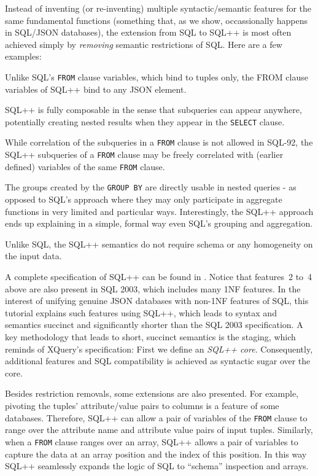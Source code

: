   Instead of inventing (or re-inventing) multiple syntactic/semantic features for the same fundamental functions (something that, as we show, occassionally happens in SQL/JSON databases), the extension from SQL to SQL++ is most often achieved simply by {\em removing} semantic restrictions of SQL. Here are a few examples:
\begin{compact_enum}
\item Unlike SQL's \texttt{FROM} clause variables, which bind to tuples only, the FROM clause variables of SQL++ bind to any JSON element.
\item SQL++ is fully composable in the sense that subqueries can appear anywhere, potentially creating nested results when they appear in the \texttt{SELECT} clause.
\item While correlation of the subqueries in a \texttt{FROM} clause is not allowed in SQL-92, the SQL++ subqueries of a \texttt{FROM} clause may be freely correlated with (earlier defined) variables of the same \texttt{FROM} clause.
\item The groups created by the \texttt{GROUP BY} are directly usable in nested queries - as opposed to SQL's approach where they may only participate in aggregate functions in very limited and particular ways. Interestingly, the SQL++ approach ends up explaining in a simple, formal way even SQL's grouping and aggregation.
\item Unlike SQL, the SQL++ semantics do not require schema or any homogeneity on the input data. 
\end{compact_enum}

A complete specification of SQL++ can be found in \cite{sqlpp-survey-2015}.
Notice that features~2 to~4 above are also present in SQL 2003, which includes many 1NF features. In the interest of unifying genuine JSON databases with non-1NF features of SQL, this tutorial explains such features using SQL++, which leads to syntax and semantics succinct and significantly shorter than the SQL 2003 specification. A key methodology that leads to short, succinct semantics is the staging, which reminds of XQuery's specification: First we define an {\em SQL++ core}. Consequently, additional features and SQL compatibility is achieved as syntactic sugar over the core. 

Besides restriction removals, some extensions are also presented. For example, pivoting the tuples' attribute/value pairs to columns is a feature of some databases. Therefore, SQL++ can allow a pair of variables of the \texttt{FROM} clause to range over the attribute name and attribute value pairs of input tuples. Similarly, when a \texttt{FROM} clause ranges over an array, SQL++ allows a pair of variables to capture the data at an array position and the index of this position. In this way SQL++ seamlessly expands the logic of SQL to ``schema'' inspection and arrays.

